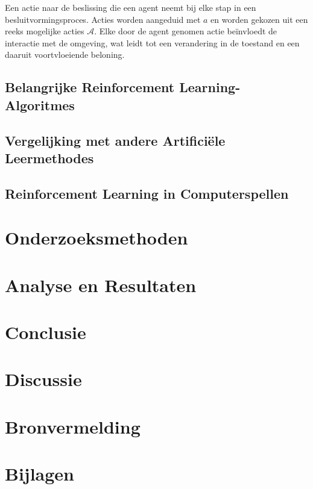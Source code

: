 \documentclass[a4paper,12pt]{article}
\begin{document}
Een actie naar de beslissing die een agent neemt bij elke
stap in een besluitvormingsproces. Acties worden aangeduid met \( a \) en
worden gekozen uit een reeks mogelijke acties \( \mathcal{A} \). Elke door de
agent genomen actie beïnvloedt de interactie met de omgeving, wat leidt tot een
verandering in de toestand en een daaruit voortvloeiende beloning.

\subsection{Belangrijke Reinforcement Learning-Algoritmes}
\subsection{Vergelijking met andere Artificiële Leermethodes}
\subsection{Reinforcement Learning in Computerspellen}

\newpage
\section{Onderzoeksmethoden}
\newpage
\section{Analyse en Resultaten}
\newpage
\section{Conclusie}
\newpage
\section{Discussie}
\newpage
\section{Bronvermelding}
\newpage
\section{Bijlagen}

\end{document}
